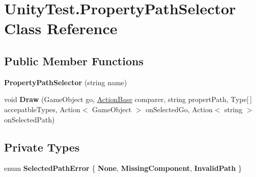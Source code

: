 \hypertarget{class_unity_test_1_1_property_path_selector}{}\section{Unity\+Test.\+Property\+Path\+Selector Class Reference}
\label{class_unity_test_1_1_property_path_selector}
\subsection*{Public Member Functions}
\begin{DoxyCompactItemize}
\item 
\mbox{\label{class_unity_test_1_1_property_path_selector_a1d0fd9249cc7ceb907a6b2e860ecdd3f}} 
{\bfseries Property\+Path\+Selector} (string name)
\item 
\mbox{\label{class_unity_test_1_1_property_path_selector_a298c2a3cf7ad503afcff8f39820505f7}} 
void {\bfseries Draw} (Game\+Object go, \hyperlink{class_unity_test_1_1_action_base}{Action\+Base} comparer, string propert\+Path, Type\mbox{[}$\,$\mbox{]} accepatble\+Types, Action$<$ Game\+Object $>$ on\+Selected\+Go, Action$<$ string $>$ on\+Selected\+Path)
\end{DoxyCompactItemize}
\subsection*{Private Types}
\begin{DoxyCompactItemize}
\item 
\mbox{\label{class_unity_test_1_1_property_path_selector_ad81f0fff0fa2752f31f32156a4143f16}} 
enum {\bfseries Selected\+Path\+Error} \{ {\bfseries None}, 
{\bfseries Missing\+Component}, 
{\bfseries Invalid\+Path}
 \}
\end{DoxyCompactItemize}
